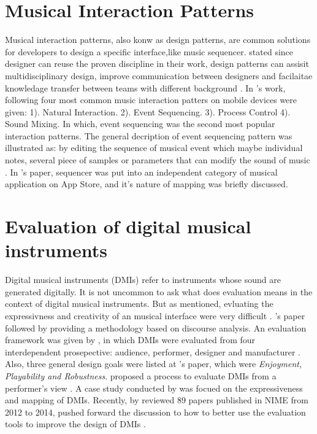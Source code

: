 \section{Musical Interaction Patterns}
Musical interaction patterns, also konw as design patterns, are common solutions for developers to design a specific interface,like music sequencer. \citeauthor{Reference4} stated since designer can reuse the proven discipline in their work, design patterns can assisit multidisciplinary design, improve communication between designers and facilaitae knowledage transfer between teams with different background \citep{Reference4}. In \citeauthor{Reference4}'s work, following four most common music interaction patters on mobile devices were given:
1). Natural Interaction. 2). Event Sequencing. 3). Process Control 4). Sound Mixing.
In which, event sequencing was the second most popular interaction patterns. The general decription of event sequencing pattern was illustrated as: by editing the sequence of musical event which maybe individual notes, several piece of samples or parameters that can modify the sound of music \citep{Reference4}. In \citeauthor{Reference13}'s paper, sequencer was put into an independent category of musical application on App Store, and it's nature of mapping was briefly discussed.


\section{Evaluation of digital musical instruments}

Digital musical instruments (DMIs) refer to instruments whose sound are generated digitally. It is not uncommon to ask what does evaluation means in the context of digital musical instruments. But as \citeauthor{Reference25} mentioned, evluating the expressivness and creativity of an musical interface were very difficult \citep{Reference25}. \citeauthor{Reference25}'s paper followed by providing a methodology based on discourse analysis. An evaluation framework was given by \citeauthor{Reference22}, in which DMIs were evaluated from four interdependent prosepective: audience, performer, designer and manufacturer \citep{Reference22}. Also, three general design goals were listed at \citeauthor{Reference22}'s paper, which were \textit{Enjoyment, Playability and Robustness}. \citeauthor{Reference23} proposed a process to evaluate DMIs from a performer's view \citep{Reference23}. A case study conducted by \citeauthor{Reference24} was focued on the expressiveness and mapping of DMIs. Recently, by reviewed 89 papers published in NIME from 2012 to 2014, \citeauthor{Reference26} pushed forward the discussion to how to better use the evaluation tools to improve the design of DMIs \citep{Reference26}.
